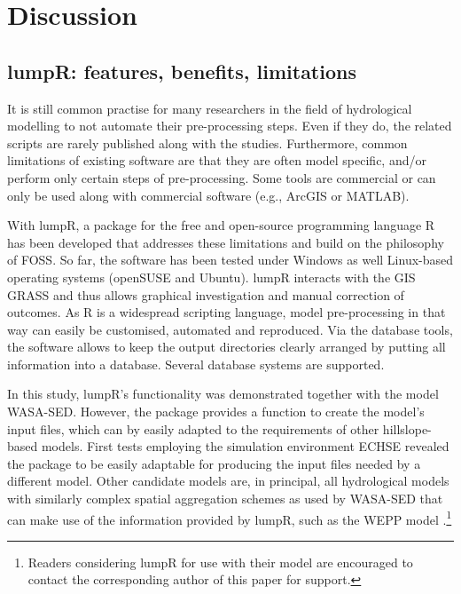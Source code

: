 \section{Discussion}
\label{sec:discussion}

\subsection{lumpR: features, benefits, limitations}
It is still common practise for many researchers in the field of hydrological modelling to not automate their pre-processing steps.
Even if they do, the related scripts are rarely published along with the studies.
Furthermore, common limitations of existing software are that they are often model specific, and/or perform only certain steps of pre-processing.
Some tools are commercial or can only be used along with commercial software (e.g., ArcGIS or MATLAB).

With lumpR, a package for the free and open-source programming language R has been developed that addresses these limitations and build on the philosophy of FOSS.
So far, the software has been tested under Windows as well Linux-based operating systems (\mbox{openSUSE} and \mbox{Ubuntu}).
lumpR interacts with the GIS GRASS and thus allows graphical investigation and manual correction of outcomes.
As R is a widespread scripting language, model pre-processing in that way can easily be customised, automated and reproduced.
Via the database tools, the software allows to keep the output directories clearly arranged by putting all information into a database.
Several database systems are supported.

In this study, lumpR's functionality was demonstrated together with the model WASA-SED.
However, the package provides a function to create the model's input files, which can by easily adapted to the requirements of other hillslope-based models.
First tests employing the simulation environment ECHSE \citep{Kneis2015} revealed the package to be easily adaptable for producing the input files needed by a different model.
Other candidate models are, in principal, all hydrological models with similarly complex spatial aggregation schemes as used by WASA-SED that can make use of the information provided by lumpR, such as the WEPP model \citep{Flanagan1995}.\footnote{Readers considering lumpR for use with their model are encouraged to contact the corresponding author of this paper for support.}

